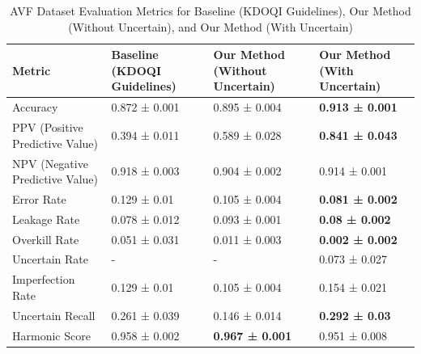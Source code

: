 \documentclass{ieeeaccess}
\begin{document}
\begin{table}[H]
\caption{AVF Dataset Evaluation Metrics for Baseline (KDOQI Guidelines), Our Method (Without Uncertain), and Our Method (With Uncertain)}
\label{CombinedMetricsAVF}
\setlength{\tabcolsep}{3pt}
\renewcommand{\arraystretch}{1.5}
\begin{tabular}{|p{80pt}|p{45pt}|p{45pt}|p{45pt}|}
\hline
Metric & Baseline (KDOQI Guidelines) & Our Method (Without Uncertain) & Our Method (With Uncertain) \\ 
\hline
Accuracy & 0.872 ± 0.001 & 0.895 ± 0.004 & \textbf{0.913 ± 0.001} \\ 
\hline
PPV (Positive Predictive Value) & 0.394 ± 0.011 & 0.589 ± 0.028 & \textbf{0.841 ± 0.043} \\ 
\hline
NPV (Negative Predictive Value) & 0.918 ± 0.003 & 0.904 ± 0.002 & 0.914 ± 0.001 \\ 
\hline
Error Rate & 0.129 ± 0.01 & 0.105 ± 0.004 & \textbf{0.081 ± 0.002} \\ 
\hline
Leakage Rate & 0.078 ± 0.012 & 0.093 ± 0.001 & \textbf{0.08 ± 0.002} \\ 
\hline
Overkill Rate & 0.051 ± 0.031 & 0.011 ± 0.003 & \textbf{0.002 ± 0.002} \\ 
\hline
Uncertain Rate & - & - & 0.073 ± 0.027 \\ 
\hline
Imperfection Rate & 0.129 ± 0.01 & 0.105 ± 0.004 & 0.154 ± 0.021 \\ 
\hline
Uncertain Recall & 0.261 ± 0.039 & 0.146 ± 0.014 & \textbf{0.292 ± 0.03} \\ 
\hline
Harmonic Score & 0.958 ± 0.002 & \textbf{0.967 ± 0.001} & 0.951 ± 0.008 \\ 
\hline
\end{tabular}
\end{table}
\end{document}
